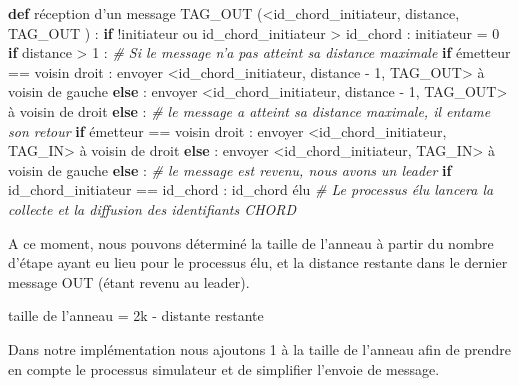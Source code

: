 \documentclass[
]{article}
\newenvironment{Shaded}{}{}
\newcommand{\CommentTok}[1]{\textcolor[rgb]{0.38,0.63,0.69}{\textit{#1}}}
\newcommand{\ControlFlowTok}[1]{\textcolor[rgb]{0.00,0.44,0.13}{\textbf{#1}}}
\newcommand{\DecValTok}[1]{\textcolor[rgb]{0.25,0.63,0.44}{#1}}
\newcommand{\KeywordTok}[1]{\textcolor[rgb]{0.00,0.44,0.13}{\textbf{#1}}}
\newcommand{\NormalTok}[1]{#1}
\newcommand{\OperatorTok}[1]{\textcolor[rgb]{0.40,0.40,0.40}{#1}}
\begin{document}
\begin{Shaded}
\begin{Highlighting}[]
\KeywordTok{def}\NormalTok{ réception d’un message TAG\_OUT (}\OperatorTok{\textless{}}\NormalTok{id\_chord\_initiateur, distance, TAG\_OUT ) :}
  \ControlFlowTok{if} \OperatorTok{!}\NormalTok{initiateur ou id\_chord\_initiateur }\OperatorTok{\textgreater{}}\NormalTok{ id\_chord :}
\NormalTok{     initiateur }\OperatorTok{=} \DecValTok{0}
     \ControlFlowTok{if}\NormalTok{ distance }\OperatorTok{\textgreater{}} \DecValTok{1}\NormalTok{ :}
       \CommentTok{\# Si le message n’a pas atteint sa distance maximale}
        \ControlFlowTok{if}\NormalTok{ émetteur }\OperatorTok{==}\NormalTok{ voisin droit :}
\NormalTok{            envoyer }\OperatorTok{\textless{}}\NormalTok{id\_chord\_initiateur, distance }\OperatorTok{{-}} \DecValTok{1}\NormalTok{, TAG\_OUT}\OperatorTok{\textgreater{}}\NormalTok{ à voisin de gauche}
        \ControlFlowTok{else}\NormalTok{ :}
\NormalTok{            envoyer }\OperatorTok{\textless{}}\NormalTok{id\_chord\_initiateur, distance }\OperatorTok{{-}} \DecValTok{1}\NormalTok{, TAG\_OUT}\OperatorTok{\textgreater{}}\NormalTok{ à voisin de droit}
     \ControlFlowTok{else}\NormalTok{ :}
      \CommentTok{\# le message a atteint sa distance maximale, il entame son retour}
        \ControlFlowTok{if}\NormalTok{ émetteur }\OperatorTok{==}\NormalTok{ voisin droit :}
\NormalTok{            envoyer }\OperatorTok{\textless{}}\NormalTok{id\_chord\_initiateur, TAG\_IN}\OperatorTok{\textgreater{}}\NormalTok{ à voisin de droit}
        \ControlFlowTok{else}\NormalTok{ :}
\NormalTok{            envoyer }\OperatorTok{\textless{}}\NormalTok{id\_chord\_initiateur, TAG\_IN}\OperatorTok{\textgreater{}}\NormalTok{ à voisin de gauche}
  \ControlFlowTok{else}\NormalTok{ :}
   \CommentTok{\# le message est revenu, nous avons un leader}
     \ControlFlowTok{if}\NormalTok{ id\_chord\_initiateur }\OperatorTok{==}\NormalTok{ id\_chord : }
\NormalTok{       id\_chord élu}
    \CommentTok{\# Le processus élu lancera la collecte et la diffusion des identifiants CHORD}
\end{Highlighting}
\end{Shaded}

A ce moment, nous pouvons déterminé la taille de l'anneau à partir du
nombre d'étape ayant eu lieu pour le processus élu, et la distance
restante dans le dernier message OUT (étant revenu au leader).

taille de l'anneau = 2k - distante restante

Dans notre implémentation nous ajoutons 1 à la taille de l'anneau afin
de prendre en compte le processus simulateur et de simplifier l'envoie
de message.
\end{document}
